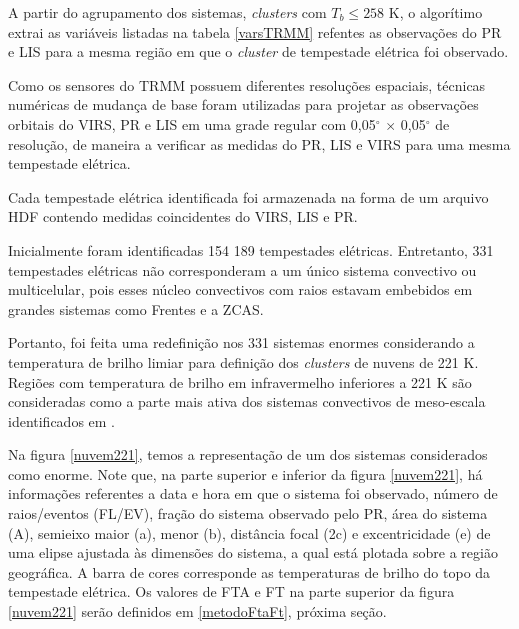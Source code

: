 
A partir do agrupamento dos sistemas, \textit{clusters} com $T_b \leq 258$ K, o algorítimo extrai as variáveis listadas na tabela \ref{varsTRMM} refentes as observações do PR e LIS para a mesma região em que o \textit{cluster} de tempestade elétrica foi observado.

Como os sensores do TRMM possuem diferentes resoluções espaciais, técnicas numéricas de mudança de base foram utilizadas para projetar as observações orbitais do VIRS, PR e LIS em uma grade regular com 0,05$^{\circ}$ $\times$ 0,05$^{\circ}$ de resolução, de maneira a verificar as medidas do PR, LIS e VIRS para uma mesma tempestade elétrica. 

Cada tempestade elétrica identificada foi armazenada na forma de um arquivo HDF contendo medidas coincidentes do VIRS, LIS e PR. 

Inicialmente foram identificadas {154 189} tempestades elétricas. Entretanto, 331 tempestades elétricas não corresponderam a um único sistema convectivo ou multicelular, pois esses núcleo convectivos com raios estavam embebidos em grandes sistemas como Frentes e a ZCAS. 

Portanto, foi feita uma redefinição nos 331 sistemas enormes considerando a temperatura de brilho limiar para definição dos \textit{clusters} de nuvens de 221 K. Regiões com temperatura de brilho em infravermelho inferiores a 221 K são consideradas como a parte mais ativa dos sistemas convectivos de meso-escala identificados em . 


Na figura \ref{nuvem221}, temos a representação de um dos sistemas considerados como enorme. Note que, na parte superior e inferior da figura \ref{nuvem221}, há informações referentes a data e hora em que o sistema foi observado, número de raios/eventos (FL/EV), fração do sistema observado pelo PR, área do sistema (A), semieixo maior (a), menor (b), distância focal (2c) e excentricidade (e) de uma elipse ajustada às dimensões do sistema, a qual está plotada sobre a região geográfica. A barra de cores corresponde as temperaturas de brilho do topo da tempestade elétrica. Os valores de FTA e FT na parte superior da figura \ref{nuvem221} serão definidos em \ref{metodoFtaFt}, próxima seção.

